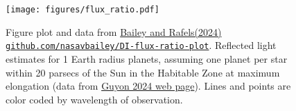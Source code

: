\documentclass[letterpaper]{ar-1col}
\newcommand{\ld}{$\lambda/D$}
\begin{document}
\begin{figure}[ht]
  \centering
  \texttt{[image: figures/flux\_ratio.pdf]}
  \caption{Figure plot and data from \citet{Bailey24} \href{https://github.com/nasavbailey/DI-flux-ratio-plot}{Bailey and Rafels(2024)  {\tt github.com/nasavbailey/DI-flux-ratio-plot}}. Reflected light estimates for 1 Earth radius planets, assuming one planet per star within 20 parsecs of the Sun in the Habitable Zone at maximum elongation (data from \href{https://subarutelescope.org/staff/guyon/04research.web/14hzplanetsELTs.web/catalog.web/content.html}{Guyon 2024 web page}).  Lines and points are color coded by wavelength of observation. 
}
\end{figure}
\end{document}
